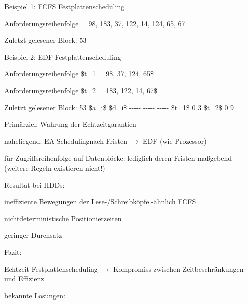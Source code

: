 \documentclass[a4paper]{article}
\begin{document}
\begin{multicols}{3}
    \begin{itemize*}
        \item
        Beispiel 1: FCFS Festplattenscheduling
        \begin{itemize*}
            \item Anforderungsreihenfolge = 98, 183, 37, 122, 14, 124, 65, 67
            \item Zuletzt gelesener Block: 53
        \end{itemize*}
        \item
        Beispiel 2: EDF Festplattenscheduling
        \begin{itemize*}
            \item Anforderungsreihenfolge \$t\_1 = 98, 37, 124, 65\$
            \item Anforderungsreihenfolge \$t\_2 = 183, 122, 14, 67\$
            \item Zuletzt gelesener Block: 53 \textbar{} \textbar{} \$a\_i\$ \textbar{} \$d\_i\$ \textbar{} \textbar{} -\/-\/-\/-\/- \textbar{} -\/-\/-\/-\/- \textbar{} -\/-\/-\/-\/- \textbar{} \textbar{} \$t\_1\$ \textbar{} 0 \textbar{} 3 \textbar{} \textbar{} \$t\_2\$ \textbar{} 0 \textbar{} 9 \textbar{}
        \end{itemize*}
        \item
        Primärziel: Wahrung der Echtzeitgarantien
        \begin{itemize*}
            \item naheliegend: EA-Schedulingnach Fristen $\rightarrow$ EDF (wie Prozessor)
            \item für Zugriffsreihenfolge auf Datenblöcke: lediglich deren Fristen maßgebend (weitere Regeln existieren nicht!)
        \end{itemize*}
        \item
        Resultat bei HDDs:
        \begin{itemize*}
            \item ineffiziente Bewegungen der Lese-/Schreibköpfe -ähnlich FCFS
            \item nichtdeterministische Positionierzeiten
            \item geringer Durchsatz
        \end{itemize*}
        \item
        Fazit:
        \begin{itemize*}
            \item Echtzeit-Festplattenscheduling $\rightarrow$ Kompromiss zwischen Zeitbeschränkungen und Effizienz
        \end{itemize*}
        \item
        bekannte Lösungen:
        \begin{enumerate*}


\end{enumerate*}
\end{itemize*}
\end{multicols}
\end{document}
